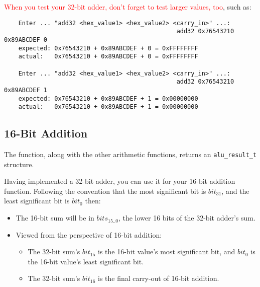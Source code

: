 \textcolor{red}{When you test your 32-bit adder, don't forget to test larger values, too}, such as:
\begin{verbatim}
    Enter ... "add32 <hex_value1> <hex_value2> <carry_in>" ...:
                                                add32 0x76543210 0x89ABCDEF 0
    expected: 0x76543210 + 0x89ABCDEF + 0 = 0xFFFFFFFF
    actual:   0x76543210 + 0x89ABCDEF + 0 = 0xFFFFFFFF

    Enter ... "add32 <hex_value1> <hex_value2> <carry_in>" ...:
                                                add32 0x76543210 0x89ABCDEF 1
    expected: 0x76543210 + 0x89ABCDEF + 1 = 0x00000000
    actual:   0x76543210 + 0x89ABCDEF + 1 = 0x00000000
\end{verbatim}


\subsection{16-Bit Addition}

The  function, along with the other arithmetic functions, returns an \lstinline{alu_result_t} structure.

Having implemented a 32-bit adder, you can use it for your 16-bit addition function.
Following the convention that the most significant bit is $bit_{31}$, and the least significant bit is $bit_0$ then:
\begin{itemize}
    \item The 16-bit sum will be in $bits_{15..0}$, the lower 16 bits of the 32-bit adder's sum.
    \item Viewed from the perspective of 16-bit addition:
        \begin{itemize}
            \item The 32-bit sum's $bit_{15}$ is the 16-bit value's most significant bit, and $bit_0$ is the 16-bit value's least significant bit.
            \item The 32-bit sum's $bit_{16}$ is the final carry-out of 16-bit addition.
        \end{itemize}
\end{itemize}

\begin{description}
\end{description}


